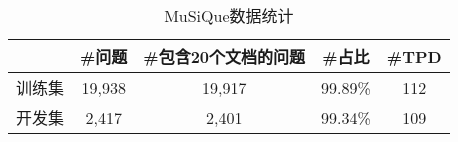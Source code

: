 \begin{table}[htbp]
    \centering
    \caption{MuSiQue数据统计}
    \label{tab:2-3}
    \begin{tabular}{c|c|c|c|c}
        \hline
        & \#问题 & \#包含20个文档的问题 & \#占比 & \#TPD \\
        \hline
        训练集 & 19,938 & 19,917 & 99.89\% & 112 \\
        开发集 & 2,417 & 2,401 & 99.34\% & 109 \\
        \hline
    \end{tabular}
\end{table}

